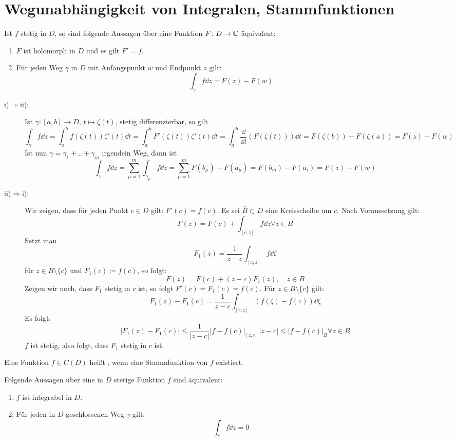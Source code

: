 \section{Wegunabh\"angigkeit von Integralen, Stammfunktionen}
\begin{satz}
	Ist $ f $ stetig in $ D $, so sind folgende Aussagen \"uber eine Funktion $ F\colon D\rightarrow\mathbb{C} $ \"aquivalent:
	\begin{enumerate}
		\item $ F $ ist holomorph in $ D $ und es gilt $ F'=f $.
		\item F\"ur jeden Weg $ \gamma $ in $ D $ mit Anfangspunkt $ w $ und Endpunkt $ z $ gilt:
		\[ \int_{\gamma}^{} f\dd z=F(z)-F(w) \]
	\end{enumerate}
\end{satz}
\begin{beweis}
	\begin{description}
		\item[i)$ \Rightarrow $ii):] Ist $ \gamma\colon[a,b]\rightarrow D $, $ t\mapsto \zeta(t) $, stetig differenzierbar, so gilt
		\[ \int_{\gamma}^{} f\dd z=\int_a^b f(\zeta(t))\zeta'(t)\dd t=\int_a^b F'(\zeta(t))\zeta'(t)\dd t=\int_a^b\frac{\dd}{\dd t}(F(\zeta(t)))\dd t=F(\zeta(b))-F(\zeta(a))=F(z)-F(w) \]
		Ist nun $ \gamma=\gamma_1+..+\gamma_m $ irgendein Weg, dann ist
		\[ \int_{\gamma}^{} f\dd z=\sum_{\mu=1}^{m}\int_{\gamma_\mu}f\dd z=\sum_{\mu=1}^{m} F(b_\mu)-F(a_\mu)=F(b_m)-F(a_i)=F(z)-F(w) \]
		\item[ii)$ \Rightarrow $i):] Wir zeigen, dass f\"ur jeden Punkt $ c\in D $ gilt: $ F'(c)=f(c) $. Es sei $ \bar B\subset D $ eine Kreisscheibe um $ c $. Nach Voraussetzung gilt: 
		\[ F(z)=F(c)+\int_{[c,z]} f\dd z\forall z\in B \]
		Setzt man \[ F_1(z)=\frac{1}{z-c}\int_{[c,z]}f\dd\zeta \]
		f\"ur $ z\in B\setminus\lbrace c\rbrace $ und $ F_1(c)\coloneqq f(c) $, so folgt:
		\[ F(z)=F(c)+(z-c)F_1(z),\quad z\in B \]
		Zeigen wir noch, dass $ F_1 $ stetig in $ c $ ist, so folgt $ F'(c)=F_1(c)=f(c) $. F\"ur $ z\in B\setminus\lbrace c\rbrace $ gilt:
		\[ F_1(z)-F_1(c)=\frac{1}{z-c}\int_{[c,z]}^{} (f(\zeta)-f(c))\dd\zeta \]
		Es folgt:
		\[ |F_1(z)-F_1(c)|\leq\frac{1}{|z-c|}|f-f(c)|_{[z,c]}|z-c|\leq |f-f(c)|_B\forall z\in B \]
		$ f $ ist stetig, also folgt, dass $ F_1 $ stetig in $ c $ ist.
	\end{description}
\end{beweis}
Eine Funktion $ f\in C(D) $ hei\ss t , wenn eine Stammfunktion von $ f $ existiert.\\
\begin{satz}
	Folgende Aussagen \"uber eine in $ D $ stetige Funktion $ f $ sind \"aquivalent:
	\begin{enumerate}
		\item $ f $ ist integrabel in $ D $.
		\item F\"ur jeden in $ D $ geschlossenen Weg $ \gamma $ gilt:
		\[ \int_{\gamma}^{} f\dd z=0 \]
	\end{enumerate}
\end{satz}
